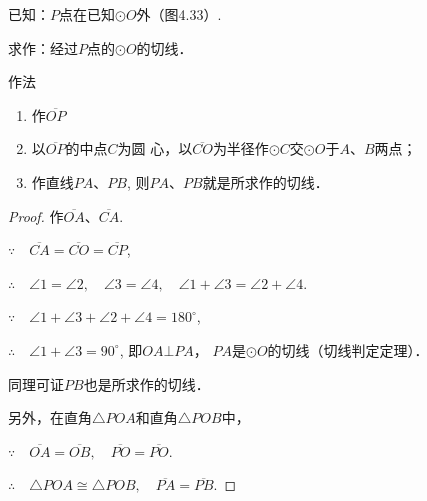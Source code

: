 \begin{example}
    已知：$P$点在已知$\odot O$外（图4.33）.

求作：经过$P$点的$\odot O$的切线．

作法
\begin{enumerate}
    \item 作$\overline{OP}$
    \item 以$\overline{OP}$的中点$C$为圆
心，以$\overline{CO}$为半径作$\odot C$交$\odot O$于$A$、$B$两点；
\item 作直线$PA$、$PB$, 则$PA$、$PB$就是所求作的切线．
\end{enumerate}
\end{example}

\begin{figure}[htp]
    \centering
{}
    \caption{}
\end{figure}



\begin{proof}
  作$\overline{OA}$、$\overline{CA}$.

$\because\quad  \overline{CA}=\overline{CO}=\overline{CP}$,

$\therefore\quad \angle 1=\angle 2,\quad \angle 3=\angle 4,\quad \angle 1+\angle 3=\angle 2+\angle 4$.

$\because\quad \angle 1+\angle 3+\angle 2+\angle 4=180^{\circ}$,

$\therefore\quad \angle 1+\angle 3=90^{\circ}$, 即$OA\bot PA$，
$PA$是$\odot O$的切线（切线判定定理）．

同理可证$PB$也是所求作的切线．

另外，在直角$\triangle POA$和直角$\triangle POB$中，

$\because\quad \overline{OA}=\overline{OB},\quad \overline{PO}=\overline{PO}$.

$\therefore\quad \triangle POA\cong \triangle POB,\quad 
\overline{PA}=\overline{PB}$.  
\end{proof}

